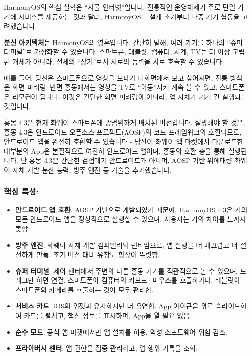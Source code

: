 


HarmonyOS의 핵심 철학은 “사물 인터넷”입니다. 전통적인 운영체제가 주로 단일 기기에 서비스를 제공하는 것과 달리, HarmonyOS는 설계 초기부터 다중 기기 협동을 고려했습니다.

\textbf{분산 아키텍처}는 HarmonyOS의 영혼입니다. 간단히 말해, 여러 기기를 하나의 “슈퍼 터미널”로 가상화할 수 있습니다. 스마트폰, 태블릿, 컴퓨터, 시계, TV는 더 이상 고립된 개체가 아니라, 전체의 “장기”로서 서로의 능력을 서로 호출할 수 있습니다.

예를 들어: 당신은 스마트폰으로 영상을 보다가 대화면에서 보고 싶어지면, 전통 방식은 화면 미러링; 반면 홍몽에서는 영상을 TV로 “이동”시켜 계속 볼 수 있고, 스마트폰은 리모컨이 됩니다. 이것은 간단한 화면 미러링이 아니라, 앱 자체가 기기 간 실행되는 것입니다.


홍몽 4.3은 현재 화웨이 스마트폰에 광범위하게 배치된 버전입니다. 설명해야 할 것은, 홍몽 4.3은 안드로이드 오픈소스 프로젝트(AOSP)의 코드 프레임워크와 호환되므로, 안드로이드 앱을 완전히 호환할 수 있습니다 - 당신이 화웨이 앱 마켓에서 다운로드한 대부분의 App은 본질적으로 여전히 안드로이드 앱이며, 홍몽의 호환 층을 통해 실행됩니다. 단 홍몽 4.3은 간단한 겉껍데기 안드로이드가 아니며, AOSP 기반 위에대량 화웨이 자체 개발 분산 능력, 방주 엔진 등 기술을 추가했습니다.

\subsubsection*{핵심 특성:}

\begin{itemize}
  \item \textbf{안드로이드 앱 호환}: AOSP 기반으로 개발되었기 때문에, HarmonyOS 4.3은 거의 모든 안드로이드 앱을 정상적으로 실행할 수 있으며, 사용자는 거의 차이를 느끼지 못함.
  \item \textbf{방주 엔진}: 화웨이 자체 개발 컴파일러와 런타임으로, 앱 실행을 더 매끄럽고 더 절전하게 만듦. 초기 버전 대비 유창도 향상이 뚜렷함.
  \item \textbf{슈퍼 터미널}: 제어 센터에서 주변의 다른 홍몽 기기를 직관적으로 볼 수 있으며, 드래그만 하면 연결. 스마트폰이 컴퓨터의 키보드·마우스를 호출하거나, 태블릿이 스마트폰의 카메라를 호출하는 것이 모두 편리함.
  \item \textbf{서비스 카드}: iOS의 위젯과 유사하지만 더 유연함. App 아이콘을 위로 슬라이드하여 카드를 펼치고, 핵심 정보를 표시하며, App을 열 필요 없음.
  \item \textbf{순수 모드}: 공식 앱 마켓에서만 앱 설치를 허용, 악성 소프트웨어 위험 감소.
  \item \textbf{프라이버시 센터}: 앱 권한을 집중 관리하고, 앱 행위 기록을 조회.
\end{itemize}

